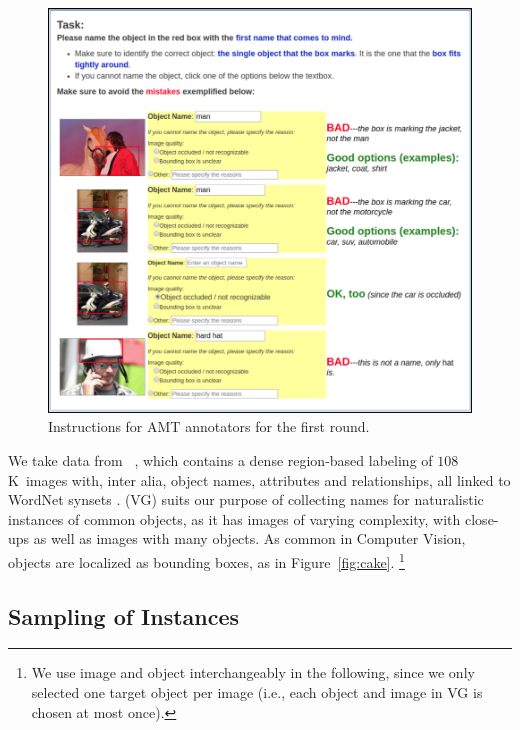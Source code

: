 \begin{figure}[htp]
  \centering
  \includegraphics[width=1.5\columnwidth]{figures/round0.png}
  \caption{Instructions for AMT annotators for the first round.}
  \label{fig:instructions1}
\end{figure}

We take data from \vgenome~\cite{krishna2016visualgenome}, which
contains a dense region-based labeling of $108$K~images with, inter alia, object names, attributes and relationships,
all linked to WordNet synsets \cite{fellbaum1998wordnet}.
\vgenome (VG) suits our purpose of collecting names for naturalistic instances of common objects, as it has images of varying complexity, with close-ups as well as images with many objects.
As common in Computer Vision, objects are localized as bounding boxes, as in Figure~\ref{fig:cake}.%
\footnote{We use image and object interchangeably in the following, since we only selected one target object per image (i.e., each object and image in VG is chosen at most once).}

\subsection{Sampling of Instances}
\label{ssec:sampling}


